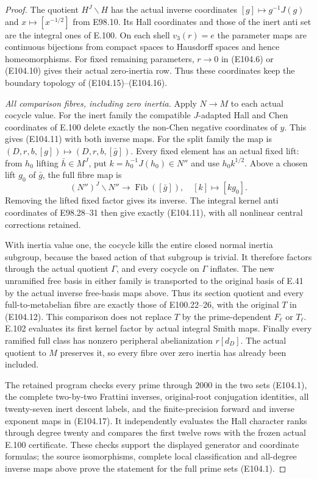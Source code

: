 \begin{proof}
The quotient $H^J\backslash H$ has the actual
inverse coordinates
$[g]\mapsto g^{-1}J(g)$ and
$x\mapsto[x^{-1/2}]$ from E98.10.
Its Hall coordinates and those of the inert
anti set are the integral ones of E.100.
On each shell $v_3(r)=e$ the parameter maps
are continuous bijections from compact spaces
to Hausdorff spaces and hence homeomorphisms.
For fixed remaining parameters, $r\to0$ in
(E104.6) or (E104.10) gives their actual
zero-inertia row. Thus these coordinates keep
the boundary topology of (E104.15)--(E104.16).

\emph{All comparison fibres, including zero inertia.}
Apply $N\to M$ to each actual cocycle value.
For the inert family the compatible $J$-adapted
Hall and Chen coordinates of E.100 delete exactly
the non-Chen negative coordinates of $y$.
This gives (E104.11) with both inverse maps.
For the split family the map is
$(D,r,b,[g])\mapsto(D,r,b,[\bar g])$.
Every fixed element has an actual fixed lift:
from $h_0$ lifting $\bar h\in M^J$, put
$k=h_0^{-1}J(h_0)\in N''$ and use $h_0k^{1/2}$.
Above a chosen lift $g_0$ of $\bar g$, the full
fibre map is
\[
 (N'')^J\backslash N''\longrightarrow\operatorname{Fib}([\bar g]),
                     \quad[k]\longmapsto[kg_0].
 \tag{E104.18}
\]
Removing the lifted fixed factor gives its inverse.
The integral kernel anti coordinates of E98.28--31
then give exactly (E104.11), with all nonlinear
central corrections retained.

With inertia value one, the cocycle kills the
entire closed normal inertia subgroup, because
the based action of that subgroup is trivial.
It therefore factors through the actual quotient
$\Gamma$, and every cocycle on $\Gamma$ inflates.
The new unramified free basis in either family is
transported to the original basis of E.41 by the
actual inverse free-basis maps above. Thus its
section quotient and every full-to-metabelian
fibre are exactly those of E100.22--26, with
the original $T$ in (E104.12). This comparison
does not replace $T$ by the prime-dependent
$F_\ell$ or $T_\ell$. E.102 evaluates its
first kernel factor by actual integral Smith maps.
Finally every ramified full class has nonzero
peripheral abelianization $r[d_D]$. The actual
quotient to $M$ preserves it, so every fibre
over zero inertia has already been included.

The retained program checks every prime through
$2000$ in the two sets (E104.1), the complete
two-by-two Frattini inverses, original-root
conjugation identities, all twenty-seven inert
descent labels, and the finite-precision forward
and inverse exponent maps in (E104.17).
It independently evaluates the Hall character
ranks through degree twenty and compares the
first twelve rows with the frozen actual
E.100 certificate. These checks support the
displayed generator and coordinate formulas;
the source isomorphisms, complete local
classification and all-degree inverse maps
above prove the statement for the full prime
sets (E104.1).
\end{proof}
